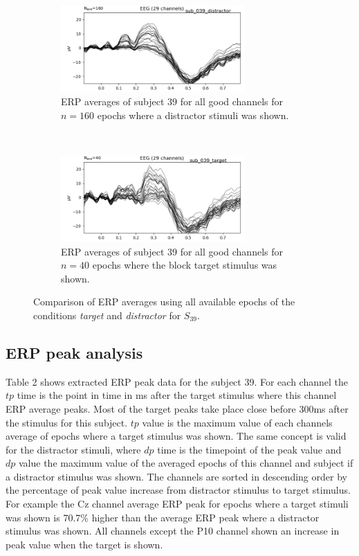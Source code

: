 \documentclass[a4paper]{article}
\begin{document}
\begin{figure}[tbh!] 
\centering
 \begin{subfigure}[t]{0.5\textwidth}
        \centering
        \includegraphics[height=1.3in]{sub039distractor.png}
	\caption{ERP averages of subject 39 for all good channels for $n=160$ epochs where a distractor stimuli was shown.}
\end{subfigure}%
    ~ 
\begin{subfigure}[t]{0.5\textwidth}
        \centering
        \includegraphics[height=1.3in]{sub039target.png}
        \caption{ERP averages of subject 39 for all good channels for $n=40$ epochs where the block target stimulus was shown.}
\end{subfigure}
    \caption{Comparison of ERP averages using all available epochs of the conditions \textit{target} and \textit{distractor} for $S_{39}$.}
     \label{fig:erpPeakAnalysis}
\end{figure}

\subsection{ERP peak analysis}
Table 2 shows extracted ERP peak data for the subject 39.
For each channel the $tp$ time is the point in time in ms after the target stimulus where this channel ERP average peaks.
Most of the target peaks take place close before 300ms after the stimulus for this subject.
$tp$ value is the maximum value of each channels average of epochs where a target stimulus was shown.
The same concept is valid for the distractor stimuli, where $dp$ time is the timepoint of the peak value and $dp$ value the maximum value of the averaged epochs of this channel and subject if a distractor stimulus was shown.
The channels are sorted in descending order by the percentage of peak value increase from distractor stimulus to target stimulus.
For example the Cz channel average ERP peak for epochs where a target stimuli was shown is 70.7\% higher than the average ERP peak where a distractor stimulus was shown.
All channels except the P10 channel shown an increase in peak value when the target is shown.
\end{document}
